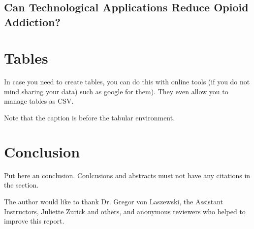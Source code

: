 \documentclass[sigconf]{acmart}
\begin{document}

\subsection{Can Technological Applications Reduce Opioid Addiction? }




\section{Tables}

In case you need to create tables, you can do this with online tools
(if you do not mind sharing your data) such as
google for them). They even allow you to manage tables as CSV.

Note that the caption is before the tabular environment.



\section{Conclusion}

Put here an conclusion. Conlcusions and abstracts must not have any
citations in the section.


\begin{acks}

    The author would like to thank Dr. Gregor von Laszewski, 
    the Assistant Instructors, Juliette Zurick and others, and 
    anonymous reviewers who helped to improve this report. 

\end{acks}
\end{document}
